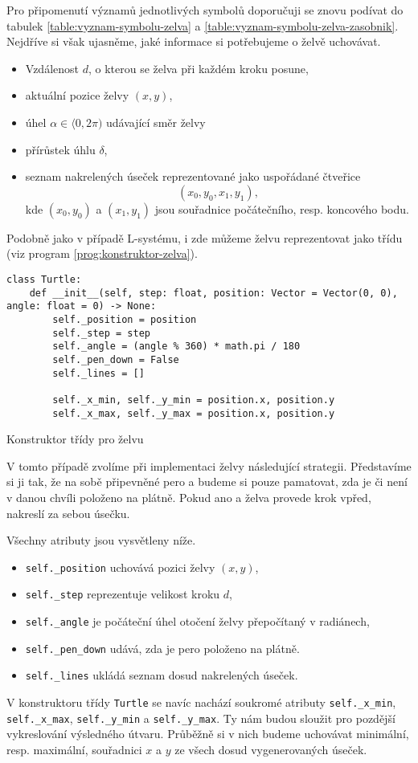 Pro připomenutí významů jednotlivých symbolů doporučuji se znovu podívat do tabulek \ref{table:vyznam-symbolu-zelva} a \ref{table:vyznam-symbolu-zelva-zasobnik}. Nejdříve si však ujasněme, jaké informace si potřebujeme o želvě uchovávat.
\begin{itemize}
    \item Vzdálenost $d$, o kterou se želva při každém kroku posune,
    \item aktuální pozice želvy $(x,y)$,
    \item úhel $\alpha\in\langle 0,2\pi)$ udávající směr želvy
    \item přírůstek úhlu $\delta$,
    \item seznam nakrelených úseček reprezentované jako uspořádané čtveřice
    \[(x_0,y_0,x_1,y_1),\]
    kde $(x_0,y_0)$ a $(x_1,y_1)$ jsou souřadnice počátečního, resp. koncového bodu.
\end{itemize}
Podobně jako v případě L-systému, i zde můžeme želvu reprezentovat jako třídu (viz program \ref{prog:konstruktor-zelva}).
\begin{program}[h]
\begin{lstlisting}[style=python]
class Turtle:
    def __init__(self, step: float, position: Vector = Vector(0, 0), angle: float = 0) -> None:
        self._position = position
        self._step = step
        self._angle = (angle % 360) * math.pi / 180
        self._pen_down = False
        self._lines = []

        self._x_min, self._y_min = position.x, position.y
        self._x_max, self._y_max = position.x, position.y
\end{lstlisting}
    \caption{Konstruktor třídy pro želvu}
    \label{prog:konstruktor-zelva}
\end{program}

V tomto případě zvolíme při implementaci želvy následující strategii. Představíme si ji tak, že na sobě připevněné pero a budeme si pouze pamatovat, zda je či není v danou chvíli položeno na plátně. Pokud ano a želva provede krok vpřed, nakreslí za sebou úsečku.

Všechny atributy jsou vysvětleny níže.
\begin{itemize}
    \item \texttt{self.\_position} uchovává pozici želvy $(x,y)$,
    \item \texttt{self.\_step} reprezentuje velikost kroku $d$,
    \item \texttt{self.\_angle} je počáteční úhel otočení želvy přepočítaný v radiánech,
    \item \texttt{self.\_pen\_down} udává, zda je pero položeno na plátně.
    \item \texttt{self.\_lines} ukládá seznam dosud nakrelených úseček.
\end{itemize}
V konstruktoru třídy \texttt{Turtle} se navíc nachází soukromé atributy \texttt{self.\_x\_min}, \texttt{self.\_x\_max}, \texttt{self.\_y\_min} a \texttt{self.\_y\_max}. Ty nám budou sloužit pro pozdější vykreslování výsledného útvaru. Průběžně si v nich budeme uchovávat minimální, resp. maximální, souřadnici $x$ a $y$ ze všech dosud vygenerovaných úseček.